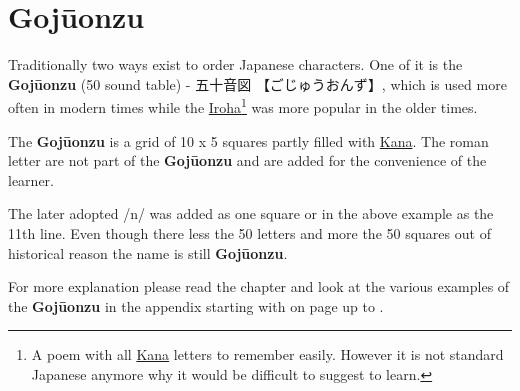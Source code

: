 \section{Gojūonzu} 
\label{sec:Gojuonzu}

Traditionally two ways exist to order Japanese characters. One of it is the
\textbf{Gojūonzu} (50 sound table) -  {五十音図}   {【ごじゅうおんず}】, which
is used more often in modern times while the
\hyperref[sec:Iroha]{Iroha}\footnote{A poem with all \hyperref[sec:Kana]{Kana}
letters to remember easily. However it is not standard Japanese anymore why it
would be difficult to suggest to learn. } was more popular in the older times.

The \textbf{Gojūonzu} is a grid of 10 x 5 squares partly filled with
\hyperref[sec:Kana]{Kana}. The roman letter are not part of the
\textbf{Gojūonzu} and are added for the convenience of the learner. 



The later adopted /n/ was added as one square or in the above example as the
11th line.  Even though there less the 50 letters and more the 50 squares out
of historical reason the name is still \textbf{Gojūonzu}.

For more explanation please read the chapter
 and look at the various examples of the
\textbf{Gojūonzu} in the appendix starting with 
on page \pageref{chap:KatakanaTables} up to \pageref{sec:KatakanaMikachanPB}.

